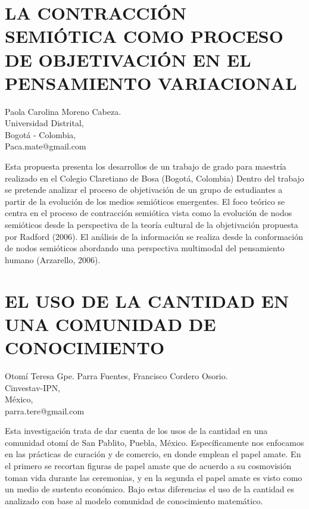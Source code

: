 \section{LA CONTRACCIÓN SEMIÓTICA COMO PROCESO DE OBJETIVACIÓN EN EL PENSAMIENTO
VARIACIONAL}

\begin{datos}
Paola Carolina Moreno Cabeza. \\
Universidad Distrital, \\
\hfill Bogotá - Colombia, \\
 \hfill  Paca.mate@gmail.com
\end{datos}

Esta propuesta presenta los desarrollos de un trabajo de grado para
maestría realizado en el Colegio Claretiano de Bosa (Bogotá, Colombia)
Dentro del trabajo se pretende analizar el proceso de objetivación
de un grupo de estudiantes a partir de la evolución de los medios
semióticos emergentes. El foco teórico se centra en el proceso de
contracción semiótica vista como la evolución de nodos semióticos
desde la perspectiva de la teoría cultural de la objetivación propuesta
por Radford (2006). El análisis de la información se realiza desde
la conformación de nodos semióticos abordando una perspectiva multimodal
del pensamiento humano (Arzarello, 2006). 


\section{\uppercase{ El uso de la cantidad en una comunidad de conocimiento}}

\begin{datos}
Otomí Teresa Gpe. Parra Fuentes, Francisco Cordero Osorio. \\
Cinvestav-IPN, \\
\hfill México, \\
 \hfill  parra.tere@gmail.com
\end{datos}

Esta investigación trata de dar cuenta de los usos de la cantidad
en una comunidad otomí de San Pablito, Puebla, México. Específicamente
nos enfocamos en las prácticas de curación y de comercio, en donde
emplean el papel amate. En el primero se recortan figuras de papel
amate que de acuerdo a su cosmovisión toman vida durante las ceremonias,
y en la segunda el papel amate es visto como un medio de sustento
económico. Bajo estas diferencias el uso de la cantidad es analizado
con base al modelo comunidad de conocimiento matemático. 


